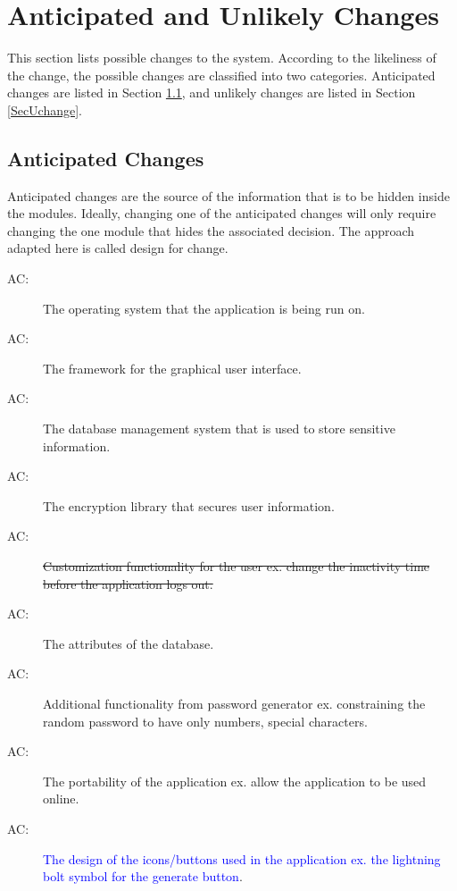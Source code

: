 \documentclass[12pt, titlepage]{article}
\newcounter{acnum}
\newcommand{\actheacnum}{AC\theacnum}
\begin{document}
\section{Anticipated and Unlikely Changes} \label{SecChange}

This section lists possible changes to the system. According to the likeliness
of the change, the possible changes are classified into two
categories. Anticipated changes are listed in Section \ref{SecAchange}, and
unlikely changes are listed in Section \ref{SecUchange}.

\subsection{Anticipated Changes} \label{SecAchange}

Anticipated changes are the source of the information that is to be hidden
inside the modules. Ideally, changing one of the anticipated changes will only
require changing the one module that hides the associated decision. The approach
adapted here is called design for change.

\begin{description}
  \item[ \actheacnum \label{acInput}:] The operating system
  that the application is being run on.
  \item[ \actheacnum \label{acFramework}:] The framework for
  the graphical user interface.
  \item[ \actheacnum \label{acDatabase}:] The database management system that is used to store sensitive information.
  \item[ \actheacnum \label{acEncryption}:] The encryption library that secures user information.
  \item[ \actheacnum \label{acUserCustom}:] \sout{Customization functionality for the user ex. change the inactivity time before the application logs out.}
  \item[ \actheacnum \label{acDBAttributes}:] The attributes of the database.
  \item[ \actheacnum \label{acPassGenFunc}:] Additional functionality from password generator ex. constraining the random password to have only numbers, special characters.
  \item[ \actheacnum \label{acPortability}:] The portability of the application ex. allow the application to be used online.
  \item[ \actheacnum \label{acUnderstand}:] \textcolor{blue}{The design of the icons/buttons used in the application ex. the lightning bolt symbol for the generate button}.
\end{description}
\end{document}
